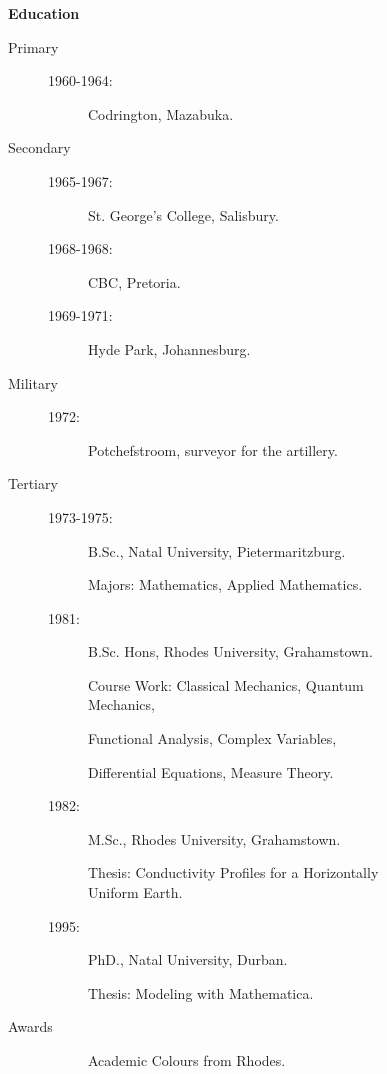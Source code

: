 \begin{description}\item[] \begin{description}\item[] {\large \bf   Education  }
\begin{description}
\item[Primary]  
\begin{description} \item[]
\item[ 1960-1964: ] Codrington, Mazabuka.
\end{description}
\item[Secondary]  
\begin{description} \item[]
\item[ 1965-1967:] St. George's College, Salisbury.                        
\item[ 1968-1968:] CBC, Pretoria.                        
\item[ 1969-1971:] Hyde Park, Johannesburg.
\end{description}
\item[Military]   
\begin{description} \item[]
\item[ 1972: ] Potchefstroom,  surveyor for the artillery. 
\end{description}
\item[Tertiary] 
\begin{description}
\item[] 
\end{description}
  \begin{description} 
  \item[ 1973-1975:]  B.Sc., Natal University, Pietermaritzburg. 
  \item[]
              Majors: Mathematics, Applied Mathematics.       
  \item[ 1981:]  B.Sc. Hons, Rhodes University, Grahamstown.
  \item[]  
             Course Work: Classical Mechanics, Quantum Mechanics,
  \item[]
             Functional Analysis, Complex Variables,
   \item[]          
             Differential Equations, Measure Theory. 
   \item[ 1982: ] M.Sc., Rhodes University, Grahamstown. 
   \item[]  
     Thesis: Conductivity Profiles for a Horizontally Uniform Earth. 
	\item[ 1995: ] PhD., Natal University, Durban. 
	\item[] 
     Thesis: Modeling with Mathematica. 
     \end{description}
\item[Awards] 
  \begin{description} \item[ ]Academic Colours from Rhodes.  
\end{description}
\end{description}
\end{description}
\end{description}
\label{f0}

